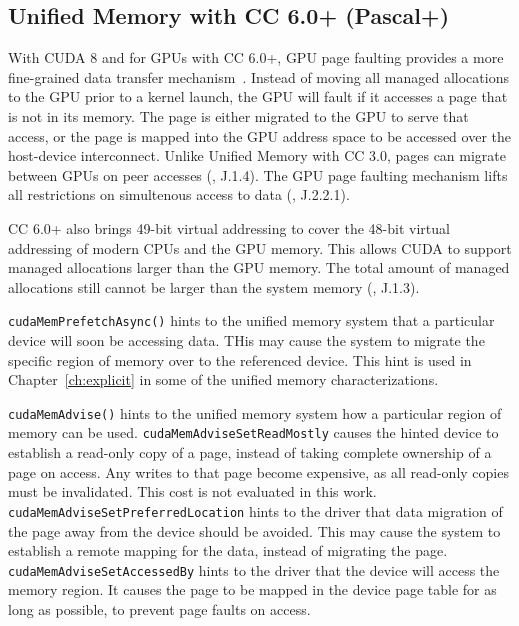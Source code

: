 \subsection{Unified Memory with CC 6.0+ (Pascal+)}
\label{sec:unified-cc6}

With CUDA 8 and for GPUs with CC 6.0+, GPU page faulting provides a more fine-grained data transfer mechanism~\cite{nvidia2017cuda80}.
Instead of moving all managed allocations to the GPU prior to a kernel launch, the GPU will fault if it accesses a page that is not in its memory.
The page is either migrated to the GPU to serve that access, or the page is mapped into the GPU address space to be accessed over the host-device interconnect.
Unlike Unified Memory with CC 3.0, pages can migrate between GPUs on peer accesses (\cite{nvidia2017cuda80}, J.1.4).
The GPU page faulting mechanism lifts all restrictions on simultenous access to data (\cite{nvidia2017cuda80}, J.2.2.1).

CC 6.0+ also brings 49-bit virtual addressing to cover the 48-bit virtual addressing of modern CPUs and the GPU memory.
This allows CUDA to support managed allocations larger than the GPU memory.
The total amount of managed allocations still cannot be larger than the system memory (\cite{nvidia2017cuda80}, J.1.3).

\texttt{cudaMemPrefetchAsync()} hints to the unified memory system that a particular device will soon be accessing data.
THis may cause the system to migrate the specific region of memory over to the referenced device.
This hint is used in Chapter~\ref{ch:explicit} in some of the unified memory characterizations.

\texttt{cudaMemAdvise()} hints to the unified memory system how a particular region of memory can be used.
\texttt{cudaMemAdviseSetReadMostly} causes the hinted device to establish a read-only copy of a page, instead of taking complete ownership of a page on access.
Any writes to that page become expensive, as all read-only copies must be invalidated.
This cost is not evaluated in this work.
\texttt{cudaMemAdviseSetPreferredLocation} hints to the driver that data migration of the page away from the device should be avoided.
This may cause the system to establish a remote mapping for the data, instead of migrating the page.
\texttt{cudaMemAdviseSetAccessedBy} hints to the driver that the device will access the memory region.
It causes the page to be mapped in the device page table for as long as possible, to prevent page faults on access.

